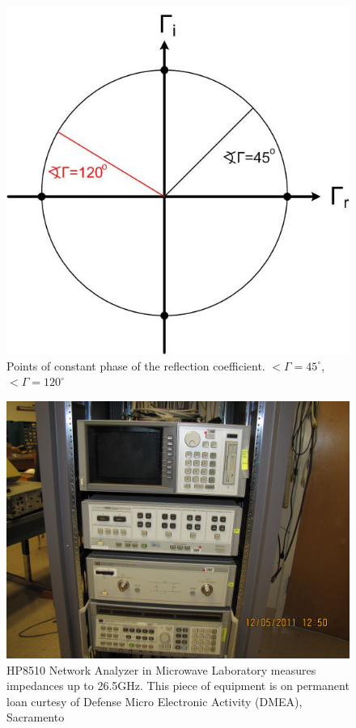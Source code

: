 \documentclass{ximera}
\begin{document}
\begin{figure}[htbp]
\begin{center}
\includegraphics[scale=0.3]{../jpg/smithchartangle.jpg}
\end{center}
\caption{Points of constant phase of the reflection coefficient. $ < \Gamma =45^\circ$, $  <  \Gamma = 120^\circ$}
\label{scswr}
\end{figure}







\begin{figure}[htbp]
\begin{center}
\includegraphics[scale=0.2]{../jpg/HP8510.jpg}
\end{center}
\caption{HP8510 Network Analyzer in Microwave Laboratory measures impedances up to 26.5GHz. This piece of equipment is on permanent loan curtesy of Defense Micro Electronic Activity (DMEA), Sacramento}
\label{hp8510}
\end{figure}
\end{document}
